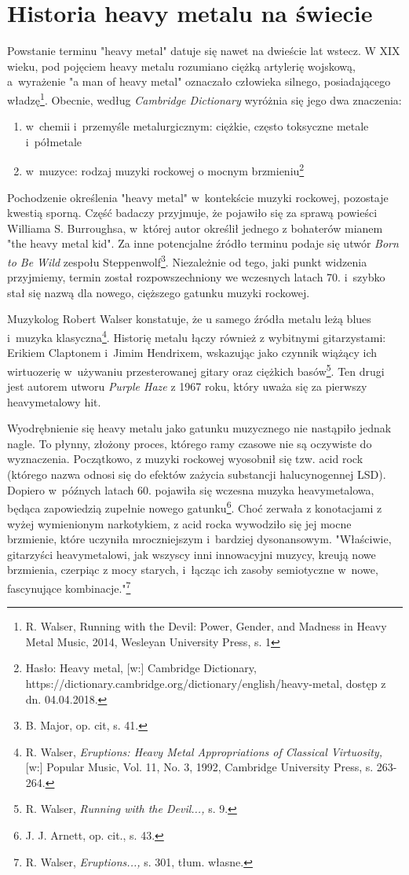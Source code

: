 \documentclass[12pt, a4paper, titlepage]{report}
\begin{document}
\section{Historia heavy metalu na świecie}
Powstanie terminu "heavy metal" datuje się nawet na dwieście lat wstecz. W XIX wieku, pod pojęciem heavy metalu rozumiano ciężką artylerię wojskową, a~wyrażenie "a man of heavy metal" oznaczało człowieka silnego, posiadającego władzę\footnote{R. Walser, Running with the Devil: Power, Gender, and Madness in Heavy Metal Music, 2014, Wesleyan University Press, s. 1}. Obecnie, według \textit{Cambridge Dictionary} wyróżnia się jego dwa znaczenia: 
\begin{enumerate}
\item w~chemii i~przemyśle metalurgicznym: ciężkie, często toksyczne metale  i~półmetale
\item w~muzyce: rodzaj muzyki rockowej o mocnym brzmieniu\footnote{Hasło: Heavy metal, [w:] Cambridge Dictionary, https://dictionary.cambridge.org/dictionary/english/heavy-metal, dostęp z dn. 04.04.2018.}
\end{enumerate}
Pochodzenie określenia "heavy metal" w~kontekście muzyki rockowej, pozostaje kwestią sporną. Część badaczy przyjmuje, że pojawiło się za sprawą powieści Williama S. Burroughsa, w~której autor określił jednego z bohaterów mianem "the heavy metal kid". Za inne potencjalne źródło terminu podaje się utwór \textit{Born to Be Wild} zespołu Steppenwolf\footnote{B. Major, op. cit, s. 41.}. Niezależnie od tego, jaki punkt widzenia przyjmiemy, termin został rozpowszechniony we wczesnych latach 70. i~szybko stał się nazwą dla nowego, cięższego gatunku muzyki rockowej. 

 
Muzykolog Robert Walser konstatuje, że u samego źródła metalu leżą blues i~muzyka klasyczna\footnote{R. Walser, \textit{Eruptions: Heavy Metal Appropriations of Classical Virtuosity,} [w:] Popular Music, Vol. 11, No. 3, 1992, Cambridge University Press, s. 263-264.}. %
Historię metalu łączy również z wybitnymi gitarzystami: Erikiem Claptonem i~Jimim Hendrixem, wskazując jako czynnik wiążący ich wirtuozerię w~używaniu przesterowanej gitary oraz ciężkich basów\footnote{R. Walser, \textit{Running with the Devil...,} s. 9.}. Ten drugi jest autorem utworu \textit{Purple Haze} z 1967 roku, który uważa się za pierwszy heavymetalowy hit.

Wyodrębnienie się heavy metalu jako gatunku muzycznego nie nastąpiło jednak nagle. To płynny, złożony proces, którego ramy czasowe nie są oczywiste do wyznaczenia. Początkowo, z muzyki rockowej wyosobnił się tzw. acid rock (którego nazwa odnosi się do efektów zażycia substancji halucynogennej LSD). Dopiero w~późnych latach 60. pojawiła się wczesna muzyka heavymetalowa, będąca zapowiedzią zupełnie nowego gatunku\footnote{J. J. Arnett, op. cit., s. 43.}. Choć zerwała z konotacjami z wyżej wymienionym narkotykiem, z acid rocka wywodziło się jej mocne brzmienie, które uczyniła mroczniejszym i~bardziej dysonansowym. "Właściwie, gitarzyści heavymetalowi, jak wszyscy inni innowacyjni muzycy, kreują nowe brzmienia, czerpiąc z mocy starych, i~łącząc ich zasoby semiotyczne w~nowe, fascynujące kombinacje."\footnote{R. Walser, \textit{Eruptions...,} s. 301, tłum. własne.}
\end{document}
